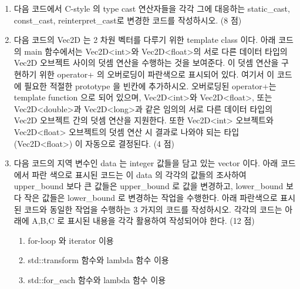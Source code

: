 \documentclass{article}
\begin{document}
\begin{enumerate}[itemsep=30pt]
        \item 다음 코드에서 C-style 의 type cast 연산자들을 각각 그에 대응하는 static\_cast, const\_cast, reinterpret\_cast로 변경한 코드를 작성하시오. (8 점)
        \item 다음 코드의 Vec2D 는 2 차원 벡터를 다루기 위한 template class 이다. 아래 코드의 main 함수에서는 Vec2D<int>와 Vec2D<float>의 서로 다른 데이터 타입의 Vec2D 오브젝트 사이의 덧셈 연산을 수행하는 것을 보여준다. 이 덧셈 연산을 구현하기 위한 operator+ 의 오버로딩이 파란색으로 표시되어 있다. 여기서 이 코드에 필요한 적절한 prototype 을 빈칸에 추가하시오. 오버로딩된 operator+는 template function 으로 되어 있으며, Vec2D<int>와 Vec2D<float>, 또는 Vec2D<double>과 Vec2D<long>과 같은 임의의 서로 다른 데이터 타입의 Vec2D 오브젝트 간의 덧셈 연산을 지원한다. 또한 Vec2D<int> 오브젝트와 Vec2D<float> 오브젝트의 덧셈 연산 시 결과로 나와야 되는 타입 (Vec2D<float>) 이 자동으로 결정된다. (4 점)
        \item 다음 코드의 지역 변수인 data 는 integer 값들을 담고 있는 vector 이다. 아래 코드에서 파란 색으로 표시된 코드는 이 data 의 각각의 값들의 조사하여 upper\_bound 보다 큰 값들은 upper\_bound 로 값을 변경하고, lower\_bound 보다 작은 값들은 lower\_bound 로 변경하는 작업을 수행한다. 아래 파란색으로 표시된 코드와 동일한 작업을 수행하는 3 가지의 코드를 작성하시오. 각각의 코드는 아래에 A,B,C 로 표시된 내용을 각각 활용하여 작성되어야 한다. (12 점)
              \begin{enumerate}[label={\Alph*.}, itemsep=15pt]
                  \item for-loop 와 iterator 이용 
                  \item std::transform 함수와 lambda 함수 이용 
                  \item std::for\_each 함수와 lambda 함수 이용 
              \end{enumerate}
    \end{enumerate}
\end{document}
